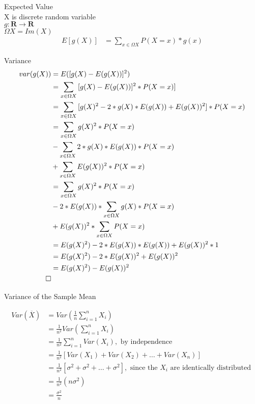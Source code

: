 \documentclass[]{article}
\title{}
\author{}
\begin{document}
	
Expected Value\\
X is discrete random variable\\
$g : \mathbf{R} \rightarrow \mathbf{R}$\\
$\Omega X = Im(X)$\\

\begin{align}
	E[g(X)] &= \sum_{x \in \Omega X} {P(X=x)*g(x)}
\end{align}

Variance\\

\begin{align}
	var(g(X)) &= E([g(X) - E(g(X))]^2)\\
	&= \sum_{x\in \Omega X} {[g(X) - E(g(X))]^2*P(X=x)]}\\
	&= \sum_{x\in \Omega X} {[g(X)^2 - 2*g(X)*E(g(X)) + E(g(X))^2]*P(X=x)}\\
	&= \sum_{x\in \Omega X} {g(X)^2*P(X=x)} \\&- \sum_{x\in \Omega X} {2*g(X)*E(g(X))*P(X=x)} \\&+ \sum_{x \in \Omega X} {E(g(X))^2*P(X=x)}\\
	&= \sum_{x\in \Omega X} {g(X)^2*P(X=x)} \\&- 2*E(g(X))*\sum_{x\in \Omega X} {g(X)*P(X=x)} \\&+ E(g(X))^2*\sum_{x \in \Omega X} {P(X=x)}\\
	&= E(g(X)^2) - 2*E(g(X))*E(g(X)) + E(g(X))^2*1\\
	&= E(g(X)^2) - 2*E(g(X))^2 + E(g(X))^2\\
	&= E(g(X)^2) - E(g(X))^2\\
	\qed
\end{align}

Variance of the Sample Mean

\begin{align}
Var\left({\overline{X}}\right)&=Var\left( \frac{1}{n}\sum_{i=1}^nX_i\right)\\&= \frac{1}{n^2}Var\left( \sum_{i=1}^nX_i\right)\\&=\frac{1}{n^2}\sum_{i=1}^nVar(X_i), \text{ by independence}\\&= \frac{1}{n^2}\left[Var(X_1)+Var(X_2)+\ldots+Var(X_n) \right]\\&=\frac{1}{n^2}\left[\sigma^2+\sigma^2+\ldots+\sigma^2  \right], \text{ since the }X_i \text{ are identically distributed }\\&= \frac{1}{n^2}(n\sigma^2)\\&=\frac{\sigma^2}{n}\end{align}
\end{document}
